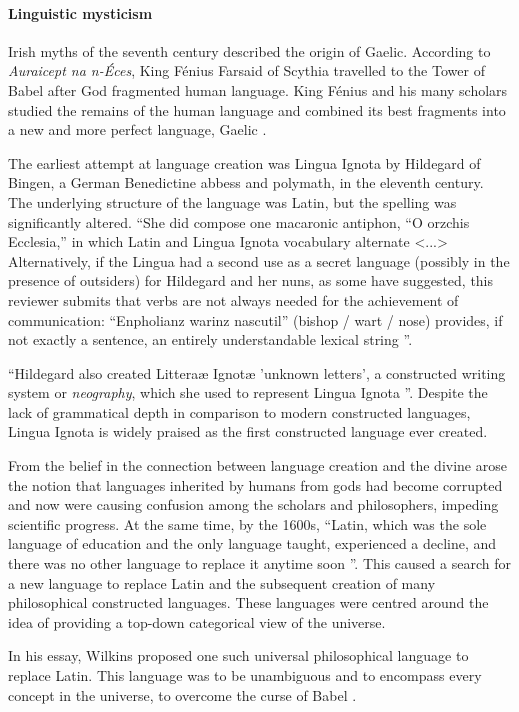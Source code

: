 \documentclass[14pt, a4paper]{extreport}
\begin{document}
        \paragraph{Linguistic mysticism}
Irish myths of the seventh century described the origin of Gaelic. According to \textit{Auraicept na n-Éces}, King Fénius Farsaid of Scythia travelled to the Tower of Babel after God fragmented human language. King Fénius and his many scholars studied the remains of the human language and combined its best fragments into a new and more perfect language, Gaelic \parencite{williams}.

The earliest attempt at language creation was Lingua Ignota by Hildegard of Bingen, a German Benedictine abbess and polymath, in the eleventh century. The underlying structure of the language was Latin, but the spelling was significantly altered. ``She did compose one macaronic antiphon, ``O orzchis Ecclesia,'' in which Latin and Lingua Ignota vocabulary alternate <...> Alternatively, if the Lingua had a second use as a secret language (possibly in the presence of outsiders) for Hildegard and her nuns, as some have suggested, this reviewer submits that verbs are not always needed for the achievement of communication: ``Enpholianz warinz nascutil'' (bishop / wart / nose) provides, if not exactly a sentence, an entirely understandable lexical string \parencite{higley}''.

``Hildegard also created Litteraæ Ignotæ 'unknown letters', a constructed writing system or \textit{neography}, which she used to represent Lingua Ignota \parencite{sanders}''. Despite the lack of grammatical depth in comparison to modern constructed languages, Lingua Ignota is widely praised as the first constructed language ever created.

From the belief in the connection between language creation and the divine arose the notion that languages inherited by humans from gods had become corrupted and now were causing confusion among the scholars and philosophers, impeding scientific progress. At the same time, by the 1600s, ``Latin, which was the sole language of education and the only language taught, experienced a decline, and there was no other language to replace it anytime soon \parencite[51]{stria}''. This caused a search for a new language to replace Latin and the subsequent creation of many philosophical constructed languages. These languages were centred around the idea of providing a top-down categorical view of the universe.

In his essay, Wilkins proposed one such universal philosophical language to replace Latin. This language was to be unambiguous and to encompass every concept in the universe, to overcome the curse of Babel \parencite[ch. 2, p. 1]{wilkins}.
\end{document}
